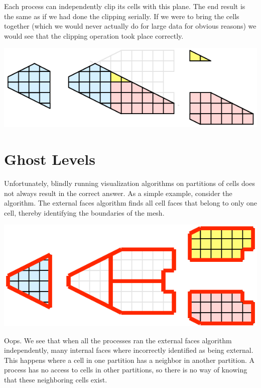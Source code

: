 Each process can independently clip its cells with this plane.  The end
result is the same as if we had done the clipping serially.  If we were to
bring the cells together (which we would never actually do for large data
for obvious reasons) we would see that the clipping operation took place
correctly.

\begin{inlinefig}
  \includegraphics[scale=\bbscale]{images/ParallelExampleClip2}
\end{inlinefig}


\section{Ghost Levels}

Unfortunately, blindly running visualization algorithms on partitions of
cells does not always result in the correct answer.  As a simple example,
consider the  algorithm.  The external faces
algorithm finds all cell faces that belong to only one cell, thereby
identifying the boundaries of the mesh.

\begin{inlinefig}
  \includegraphics[scale=\bbscale]{images/ParallelExampleExternalFaces1}
\end{inlinefig}

Oops.  We see that when all the processes ran the external faces algorithm
independently, many internal faces where incorrectly identified as being
external.  This happens where a cell in one partition has a neighbor in
another partition.  A process has no access to cells in other partitions,
so there is no way of knowing that these neighboring cells exist.

